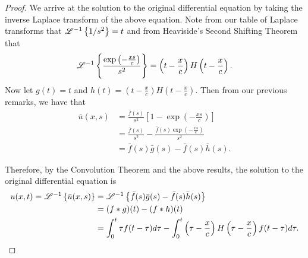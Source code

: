 \begin{proof}
  We arrive at the solution to the original differential equation by taking the inverse Laplace transform of the above equation.
  Note from our table of Laplace transforms that $\mathscr{L}^{-1}\left\{ {1/s^2} \right\} = t$ and from Heaviside's Second Shifting Theorem that
  \begin{align*}
    \mathscr{L}^{-1}\left\{ {\frac{\exp{\left(-\frac{xs}{c}\right)}}{s^2}} \right\} = \left(t- \frac{x}{c}\right)H\left(t- \frac{x}{c}\right).
  \end{align*}
  Now let $g(t) = t$ and $h(t) = \left(t- \frac{x}{c}\right)H\left(t- \frac{x}{c}\right)$. Then from our previous remarks,
  we have that
  \begin{align*}
    \bar{u}(x, s) &= \frac{\bar{f}(s)}{s^2}\left[1-\exp{\left(-\frac{xs}{c}\right)}\right] \\
    &= \frac{\bar{f}(s)}{s^2}-\frac{\bar{f}(s)\exp{\left(-\frac{xs}{c}\right)}}{s^2} \\
    &= \bar{f}(s)\bar{g}(s) - \bar{f}(s)\bar{h}(s).
  \end{align*}

  Therefore, by the Convolution Theorem and the above results, the solution
  to the original differential equation is
  \begin{align*}
    u(x, t) = \mathscr{L}^{-1}\left\{ {\bar{u}(x, s)} \right\} &= \mathscr{L}^{-1}\left\{ {\bar{f}(s)\bar{g}(s) - \bar{f}(s)\bar{h}(s)} \right\} \\
    &= (f \ast g)(t) - (f \ast h)(t) \\
    &= \int_0^t \tau f(t-\tau) d\tau - \int_0^t\left(\tau- \frac{x}{c}\right)H\left(\tau- \frac{x}{c}\right) f(t-\tau) d\tau.
  \end{align*}

\end{proof}
\newpage
